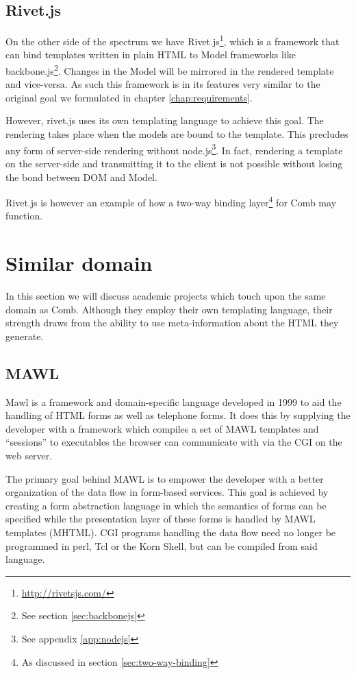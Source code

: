 \documentclass[thesis.tex]{subfiles}
\begin{document}
\subsection{Rivet.js}
On the other side of the spectrum we have
Rivet.js\footnote{\url{http://rivetsjs.com/}}, which is a framework that
can bind templates written in plain HTML to Model frameworks like
backbone.js\footnote{See section \ref{sec:backbonejs}}.
Changes in the Model will be mirrored in the rendered template and vice-versa.
As such this framework is in its features very similar to the original goal we
formulated in chapter \ref{chap:requirements}.

However, rivet.js uses its own templating language to achieve this goal.
The rendering takes place when the models are bound to the template.
This precludes any form of server-side rendering without
node.js\footnote{See appendix \ref{app:nodejs}}.
In fact, rendering a template on the server-side and transmitting it to the
client is not possible without losing the bond between DOM and Model.

Rivet.js is however an example of how a two-way binding
layer\footnote{As discussed in section \ref{sec:two-way-binding}}
for Comb may function.



\section{Similar domain}
In this section we will discuss academic projects which touch upon the same
domain as Comb.
Although they employ their own templating language, their strength draws from
the ability to use meta-information about the HTML they generate.

\subsection{MAWL}
Mawl\cite{MAWL} is a framework and domain-specific language developed in 1999
to aid the handling of HTML forms as well as telephone forms.
It does this by supplying the developer with a framework which compiles
a set of MAWL templates and ``sessions'' to executables
the browser can communicate with via the CGI on the web server.

The primary goal behind MAWL is to empower the developer with a better
organization of the data flow in form-based services.
This goal is achieved by creating a form abstraction language in which the
semantics of forms can be specified while the presentation layer of these forms
is handled by MAWL templates (MHTML).
CGI programs handling the data flow need no longer be programmed in
perl, Tcl or the Korn Shell, but can be compiled from said language.
\end{document}
